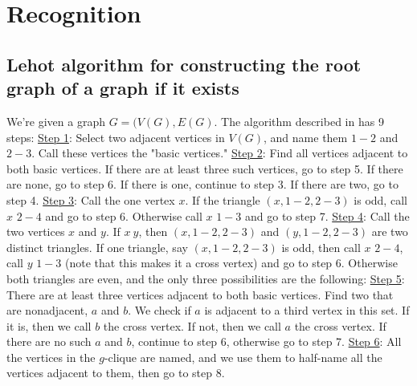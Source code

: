 \documentclass[11pt]{article}
\begin{document}
\section{Recognition}

\subsection{Lehot algorithm for constructing the root graph of a graph if it exists}

We're given a graph $G=(V(G),E(G)$. The algorithm described in \cite{Lehot} has 9 steps:
\newline
\newline
\noindent
\underline{Step 1}:
Select two adjacent vertices in $V(G)$, and name them $1-2$ and $2-3$.
Call these vertices the "basic vertices."
\newline
\newline
\noindent
\underline{Step 2}:
Find all vertices adjacent to both basic vertices.
If there are at least three such vertices, go to step 5.
If there are none, go to step 6.
If there is one, continue to step 3.
If there are two, go to step 4.
\newline
\newline
\noindent
\underline{Step 3}:
Call the one vertex $x$.
If the triangle $(x,1-2,2-3)$ is odd, call $x$ $2-4$ and go to step 6.
Otherwise call $x$ $1-3$ and go to step 7.
\newline
\newline
\noindent
\underline{Step 4}:
Call the two vertices $x$ and $y$.
If $x~y$, then $(x,1-2,2-3)$ and $(y,1-2,2-3)$ are two distinct triangles.
If one triangle, say $(x,1-2,2-3)$ is odd, then call $x$ $2-4$, call $y$ $1-3$ (note that this makes it a cross vertex) and go to step 6.
Otherwise both triangles are even, and the only three possibilities are the following:
\newline
\newline
\noindent
\underline{Step 5}:
There are at least three vertices adjacent to both basic vertices.
Find two that are nonadjacent, $a$ and $b$.
We check if $a$ is adjacent to a third vertex in this set.
If it is, then we call $b$ the cross vertex.
If not, then we call $a$ the cross vertex.
If there are no such $a$ and $b$, continue to step 6, otherwise go to step 7.
\newline
\newline
\noindent
\underline{Step 6}:
All the vertices in the $g$-clique are named, and we use them to half-name all the vertices adjacent to them, then go to step 8.
\end{document}
